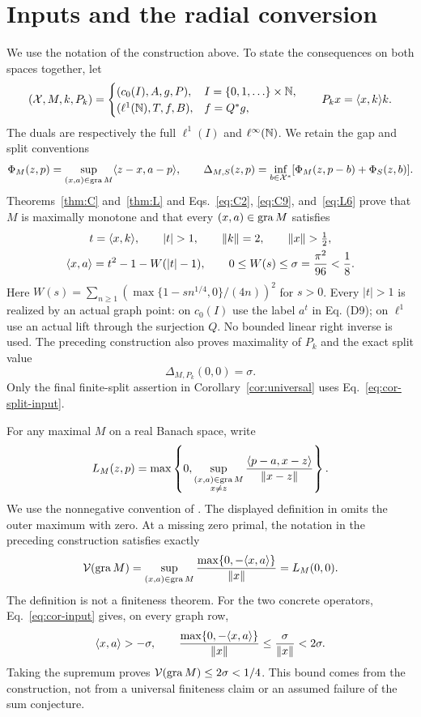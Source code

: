\section{Inputs and the radial conversion}
We use the notation of the construction above. To state the consequences on both
spaces together, let
\[
(\mathcal X,M,k,P_k)=
\begin{cases}
(c_0(I),A,g,P),&I=\{0,1,\ldots\}\times\mathbb N,\\
(\ell^1(\mathbb N),T,f,B),&f=Q^*g,
\end{cases}
\qquad P_kx=\langle x,k\rangle k.
\]
The duals are respectively the full $\ell^1(I)$ and $\ell^\infty(\mathbb N)$.
We retain the gap and split conventions
\[
\Phi_M(z,p)=\sup_{(x,a)\in\operatorname{gra} M}\langle z-x,a-p\rangle,\qquad
\Delta_{M,S}(z,p)=\inf_{b\in\mathcal X^*}
       [\Phi_M(z,p-b)+\Phi_S(z,b)].
\]
Theorems~\ref{thm:C} and~\ref{thm:L} and
Eqs.~\eqref{eq:C2}, \eqref{eq:C9}, and~\eqref{eq:L6} prove
that $M$ is maximally monotone and that every $(x,a)\in\operatorname{gra} M$ satisfies
\begin{equation}
\begin{gathered}
t=\pair{x}{k},\qquad |t|>1,\qquad
\|k\|=2,\qquad \|x\|>\tfrac12,\\
\pair{x}{a}=t^2-1-W(|t|-1),\qquad
0\le W(s)\le\sigma=\frac{\pi^2}{96}<\frac18.
\end{gathered}
\label{eq:cor-input}
\end{equation}
Here $W(s)=\sum_{n\ge1}(\max\{1-sn^{1/4},0\}/(4n))^2$ for $s>0$.
Every $|t|>1$ is realized by an actual graph point: on $c_0(I)$ use the
label $a^t$ in Eq. (D9); on $\ell^1$ use an actual lift through the
surjection $Q$. No bounded linear right inverse is used. The preceding construction
also proves maximality of $P_k$ and the exact split value
\begin{equation}
\Delta_{M,P_k}(0,0)=\sigma.
\label{eq:cor-split-input}
\end{equation}
Only the final finite-split assertion in Corollary~\ref{cor:universal}
uses Eq.~\eqref{eq:cor-split-input}.

For any maximal $M$ on a real Banach space, write
\begin{equation}
L_M(z,p)=\max\left\{0,
\sup_{\substack{(x,a)\in\operatorname{gra} M\\x\ne z}}
\frac{\langle p-a,x-z\rangle}{\|x-z\|}\right\}.
\label{eq:cor-Verona}
\end{equation}
We use the nonnegative convention of \cite{verona2008}. The displayed
definition in \cite[Section~2]{verona2012} omits the outer maximum with
zero. At a missing zero primal, the notation in
the preceding construction satisfies exactly
\begin{equation}
\mathcal V(\operatorname{gra} M)=
\sup_{(x,a)\in\operatorname{gra} M}\frac{\max\{0,-\langle x,a\rangle\}}{\|x\|}
=L_M(0,0).
\label{eq:cor-V}
\end{equation}
The definition is not a finiteness theorem. For the two concrete
operators, Eq.~\eqref{eq:cor-input} gives, on every graph row,
\[
\langle x,a\rangle>-\sigma,\qquad
\frac{\max\{0,-\langle x,a\rangle\}}{\|x\|}
\le\frac{\sigma}{\|x\|}<2\sigma.
\]
Taking the supremum proves $\mathcal V(\operatorname{gra} M)\le2\sigma<1/4$.
This bound comes from the construction, not from a universal finiteness
claim or an assumed failure of the sum conjecture.

